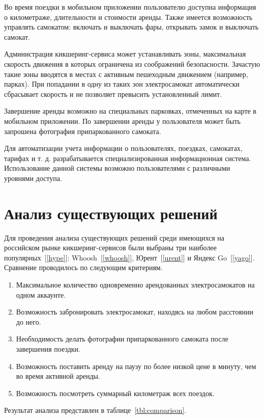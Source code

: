 Во время поездки в мобильном приложении пользователю доступна информация о километраже, длительности и стоимости аренды. Также имеется возможность управлять самокатом: включать и выключать фары, открывать замок и выключать самокат.

Администрация кикшеринг-сервиса может устанавливать зоны, максимальная скорость движения в которых ограничена из соображений безопасности. Зачастую такие зоны вводятся в местах с активным пешеходным движением (например, парках). При попадании в одну из таких зон электросамокат автоматически сбрасывает скорость и не позволяет превысить установленный лимит.

Завершение аренды возможно на специальных парковках, отмеченных на карте в мобильном приложении. По завершении аренды у пользователя может быть запрошена фотография припаркованного самоката.

Для автоматизации учета информации о пользователях, поездках, самокатах, тарифах и т. д. разрабатывается специализированная информационная система. Использование данной системы возможно пользователями с различными уровнями доступа.

\section{Анализ существующих решений}

Для проведения анализа существующих решений среди имеющихся на российском рынке кикшеринг-сервисов были выбраны три наиболее популярных~[\ref{hype}]: Whoosh~[\ref{whoosh}], Юрент~[\ref{urent}] и Яндекс Go~[\ref{yago}]. Сравнение проводилось по следующим критериям.

\begin{enumerate}
	\item Максимальное количество одновременно арендованных электросамокатов на одном аккаунте.
	\item Возможность забронировать электросамокат, находясь на любом расстоянии до него.
	\item Необходимость делать фотографии припаркованного самоката после завершения поездки.
	\item Возможность поставить аренду на паузу по более низкой цене в минуту, чем во время активной аренды.
	\item Возможность посмотреть суммарный километраж всех поездок.
\end{enumerate}

Результат анализа представлен в таблице~\ref{tbl:comparison}.

